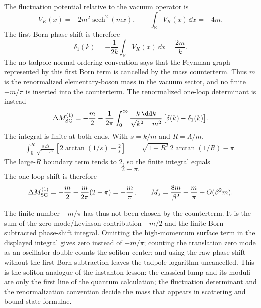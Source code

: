 The fluctuation potential relative to the vacuum operator is
\[
  V_K(x)=-2m^2\operatorname{sech}^2(mx),
  \qquad
  \int_{\mathbb R}V_K(x)\,\dd x=-4m .
\]
The first Born phase shift is therefore
\[
  \delta_1(k)
  =
  -\frac{1}{2k}\int_{\mathbb R}V_K(x)\,\dd x
  =
  \frac{2m}{k}.
\]
The no-tadpole normal-ordering convention says that the Feynman graph
represented by this first Born term is cancelled by the mass counterterm.
Thus \(m\) is the renormalized elementary-boson mass in the vacuum sector,
and no finite \(-m/\pi\) is inserted into the counterterm.  The renormalized
one-loop determinant is instead
\begin{equation}
  \Delta M_{\rm SG}^{(1)}
  =
  -\frac m2
  -
  \frac{1}{2\pi}
  \int_0^\infty
  \frac{k\,\dd k}{\sqrt{k^2+m^2}}\,
  \bigl[\delta(k)-\delta_1(k)\bigr].
  \label{eq:sine-gordon-dhn-born-subtracted-integral}
\end{equation}
The integral is finite at both ends.  With \(s=k/m\) and \(R=\Lambda/m\),
\[
\begin{aligned}
  \int_0^R
  \frac{s\,\dd s}{\sqrt{1+s^2}}
  \left[2\arctan(1/s)-\frac2s\right]
  &=
  \sqrt{1+R^2}\,2\arctan(1/R)-\pi .
\end{aligned}
\]
The large-\(R\) boundary term tends to \(2\), so the finite integral equals
\[
  2-\pi .
\]
The one-loop shift is therefore
\begin{equation}
  \Delta M_{\rm SG}^{(1)}
  =
  -\frac m2-\frac{m}{2\pi}(2-\pi)
  =
  -\frac{m}{\pi},
  \qquad
  M_s
  =
  \frac{8m}{\beta^2}-\frac{m}{\pi}+O(\beta^2 m).
  \label{eq:sine-gordon-dhn-one-loop-mass}
\end{equation}

The finite number \(-m/\pi\) has thus not been chosen by the counterterm.  It
is the sum of the zero-mode/Levinson contribution \(-m/2\) and the finite
Born-subtracted phase-shift integral.  Omitting the high-momentum surface term
in the displayed integral gives zero instead of \(-m/\pi\); counting the
translation zero mode as an oscillator double-counts the soliton center; and
using the raw phase shift without the first Born subtraction leaves the
tadpole logarithm uncancelled.  This is the soliton analogue of the instanton
lesson: the classical lump and its moduli are only the first line of the
quantum calculation; the fluctuation determinant and the renormalization
convention decide the mass that appears in scattering and bound-state
formulae.

